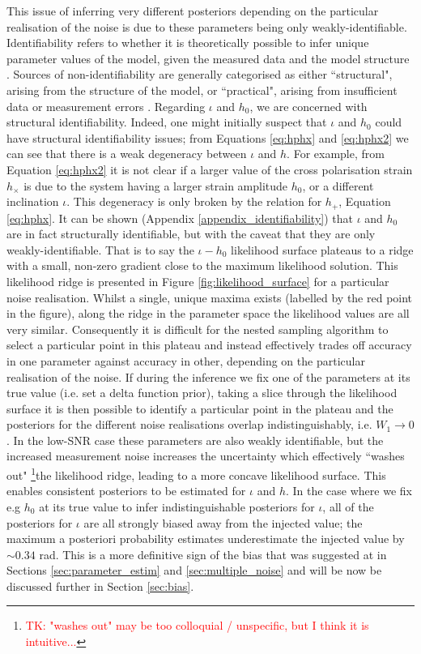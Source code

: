 \documentclass[fleqn,usenatbib,useAMS]{mnras}
\begin{document}
This issue of inferring very different posteriors depending on the particular realisation of the noise is due to these parameters being only weakly-identifiable. Identifiability refers to whether it is theoretically possible to infer unique parameter values of the model, given the measured data and the model structure \citep{e5be7c83a0d24500826f6e1b414d1733}. Sources of non-identifiability are generally categorised as either ``structural", arising from the structure of the model, or ``practical", arising from insufficient data or measurement errors \citep{GUILLAUME2019418}. Regarding $\iota$ and $h_0$, we are concerned with structural identifiability. Indeed, one might initially suspect that $\iota$ and $h_0$ could have structural identifiability issues; from Equations \eqref{eq:hphx} and \eqref{eq:hphx2} we can see that there is a weak degeneracy between $\iota$ and $h$. For example, from Equation \eqref{eq:hphx2} it is not clear if a larger value of the cross polarisation strain $h_{\times}$ is due to the system having a larger strain amplitude $h_0$, or a different inclination $\iota$. This degeneracy is only broken by the relation for $h_{+}$, Equation \eqref{eq:hphx}. It can be shown (Appendix \ref{appendix_identifiability}) that $\iota$ and $h_0$ are in fact structurally identifiable, but with the caveat that they are only weakly-identifiable. That is to say the $\iota-h_0$ likelihood surface plateaus to a ridge with a small, non-zero gradient close to the maximum likelihood solution. This likelihood ridge is presented in Figure \ref{fig:likelihood_surface} for a particular noise realisation. Whilst a single, unique maxima exists (labelled by the red point in the figure), along the ridge in the parameter space the likelihood values are all very similar. Consequently it is difficult for the nested sampling algorithm to select a particular point in this plateau and instead effectively trades off accuracy in one parameter against accuracy in other, depending on the particular realisation of the noise. If during the inference we fix one of the parameters at its true value (i.e. set a delta function prior), taking a slice through the likelihood surface it is then possible to identify a particular point in the plateau and the posteriors for the different noise realisations overlap indistinguishably, i.e. $W_1 \to 0$. In the low-SNR case these parameters are also weakly identifiable, but the increased measurement noise increases the uncertainty which effectively ``washes out" \footnote{\tiny \textcolor{red}{TK: "washes out" may be too colloquial / unspecific, but I think it is intuitive...}\normalsize}the likelihood ridge, leading to a more concave likelihood surface. This enables consistent posteriors to be estimated for $\iota$ and $h$. In the case where we fix e.g $h_0$ at its true value to infer indistinguishable posteriors for $\iota$, all of the posteriors for $\iota$ are all strongly biased away from the injected value; the maximum a posteriori probability estimates underestimate the injected value by $\sim 0.34$ rad. This is a more definitive sign of the bias that was suggested at in Sections \ref{sec:parameter_estim} and \ref{sec:multiple_noise} and will be now be discussed further in Section \ref{sec:bias}. 
\end{document}
